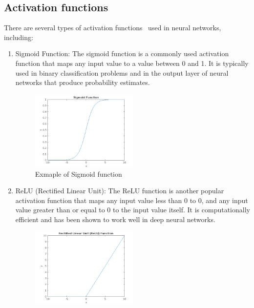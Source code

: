 \subsection{Activation functions} \label{subsec:nnaf}
There are several types of activation functions~\cite{geron2022hands} used in neural networks, including:
\begin{enumerate}
    \item Sigmoid Function: The sigmoid function is a commonly used activation function that maps any input value
    to a value between 0 and 1. It is typically used in binary classification problems and in the output layer of
    neural networks that produce probability estimates.
    \begin{center}
        \begin{figure}[!ht]
            \centering
            \includegraphics[width=0.5\textwidth]{figures/sigmoid}
            \caption{Exmaple of Sigmoid function}
            \label{fig:sigmoid}
        \end{figure}
    \end{center}
    \item ReLU (Rectified Linear Unit): The ReLU function is another popular activation function that maps any
    input value less than 0 to 0, and any input value greater than or equal to 0 to the input value itself.
    It is computationally efficient and has been shown to work well in deep neural networks.
    \begin{center}
        \begin{figure}[!ht]
            \centering
            \includegraphics[width=0.5\textwidth]{figures/relu}

\end{figure}
\end{center}
\end{enumerate}
